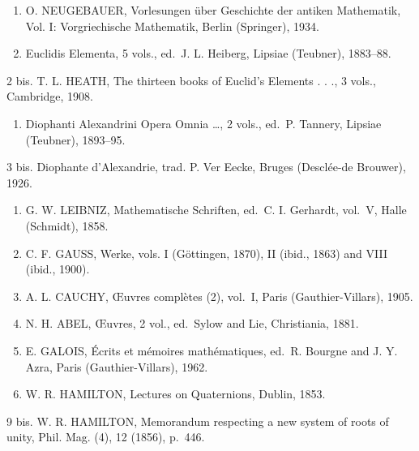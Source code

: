 
\begin{enumerate}
\def\labelenumi{\arabic{enumi}.}
\item
  O. NEUGEBAUER, Vorlesungen über Geschichte der antiken Mathematik, Vol. I: Vorgriechische Mathematik, Berlin (Springer), 1934.
\item
  Euclidis Elementa, 5 vols., ed.~J. L. Heiberg, Lipsiae (Teubner), 1883--88.
\end{enumerate}

2 bis. T. L. HEATH, The thirteen books of Euclid's Elements . . ., 3 vols., Cambridge, 1908.

\begin{enumerate}
\def\labelenumi{\arabic{enumi}.}
\setcounter{enumi}{2}
\tightlist
\item
  Diophanti Alexandrini Opera Omnia \ldots, 2 vols., ed.~P. Tannery, Lipsiae (Teubner), 1893--95.
\end{enumerate}

3 bis. Diophante d'Alexandrie, trad. P. Ver Eecke, Bruges (Desclée-de Brouwer), 1926.

\begin{enumerate}
\def\labelenumi{\arabic{enumi}.}
\setcounter{enumi}{3}
\item
  G. W. LEIBNIZ, Mathematische Schriften, ed.~C. I. Gerhardt, vol.~V, Halle (Schmidt), 1858.
\item
  C. F. GAUSS, Werke, vols. I (Göttingen, 1870), II (ibid., 1863) and VIII (ibid., 1900).
\item
  A. L. CAUCHY, Œuvres complètes (2), vol.~I, Paris (Gauthier-Villars), 1905.
\item
  N. H. ABEL, Œuvres, 2 vol., ed.~Sylow and Lie, Christiania, 1881.
\item
  E. GALOIS, Écrits et mémoires mathématiques, ed.~R. Bourgne and J. Y. Azra, Paris (Gauthier-Villars), 1962.
\item
  W. R. HAMILTON, Lectures on Quaternions, Dublin, 1853.
\end{enumerate}

9 bis. W. R. HAMILTON, Memorandum respecting a new system of roots of unity, Phil. Mag. (4), 12 (1856), p.~446.

